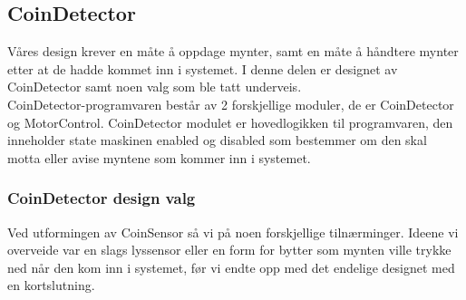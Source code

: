\documentclass[Softwaredesign/Softwaredesign_main.tex]{subfiles}
\begin{document}
\subsection{CoinDetector} \label{sec:CoinDisp}
Våres design krever en måte å oppdage mynter, samt en måte å håndtere mynter etter at de hadde kommet inn i systemet. I denne delen er designet av CoinDetector samt noen valg som ble tatt underveis. 
\\ 
CoinDetector-programvaren består av 2 forskjellige moduler, de er CoinDetector og MotorControl. CoinDetector modulet er hovedlogikken til programvaren, den inneholder state maskinen enabled og disabled som bestemmer om den skal motta eller avise myntene som kommer inn i systemet.
\subsubsection{CoinDetector design valg} 
Ved utformingen av CoinSensor så vi på noen forskjellige tilnærminger. Ideene vi overveide var en slags lyssensor eller en form for bytter som mynten ville trykke ned når den kom inn i systemet, før vi endte opp med det endelige designet med en kortslutning. 
\end{document}
